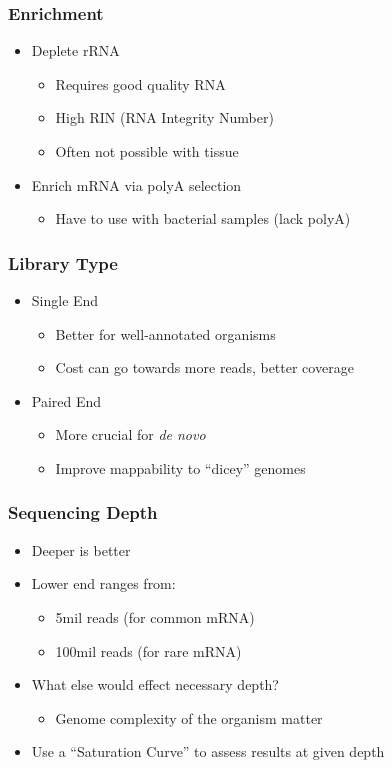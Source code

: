 \documentclass[14pt]{beamer}
\begin{document}
\begin{frame}
\frametitle{Enrichment}
\begin{itemize}
	\item<1-> Deplete rRNA
	\begin{itemize}
		\item<3-> Requires good quality RNA
		\item<4-> High RIN (RNA Integrity Number)
		\item<5-> Often not possible with tissue
	\end{itemize}
	\item<2-> Enrich mRNA via polyA selection
	\begin{itemize}
		\item<6-> Have to use with bacterial samples (lack polyA)
	\end{itemize}	
\end{itemize}
\end{frame}

\begin{frame}
\frametitle{Library Type}
\begin{itemize}
	\item<1-> Single End
	\begin{itemize}
		\item<3-> Better for well-annotated organisms
		\item<4-> Cost can go towards more reads, better coverage
	\end{itemize}
	\item<2-> Paired End
	\begin{itemize}
		\item<5-> More crucial for \textit{de novo}
		\item<6-> Improve mappability to ``dicey'' genomes
	\end{itemize}	
\end{itemize}
\end{frame}

\begin{frame}
\frametitle{Sequencing Depth}
\begin{itemize}
	\item<1-> Deeper is better
	\item<2-> Lower end ranges from:
	\begin{itemize}
		\item<3-> 5mil reads (for common mRNA)
		\item<4-> 100mil reads (for rare mRNA)
	\end{itemize}
	\item<5-> What else would effect necessary depth?
	\begin{itemize}
		\item<6-> Genome complexity of the organism matter
	\end{itemize}
	\item<7-> Use a ``Saturation Curve'' to assess results at given depth
\end{itemize}
\end{frame}
\end{document}
